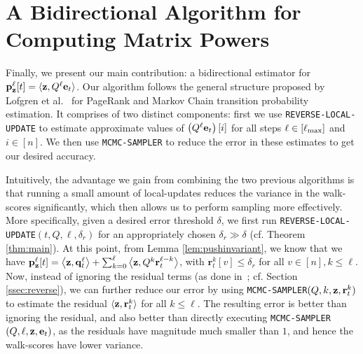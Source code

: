 
\section{A Bidirectional Algorithm for Computing Matrix Powers}
\label{ssec:bidiralgo}

Finally, we present our main contribution: a bidirectional estimator for ${\mathbf{p}}_\mathbf{z}^{\ell}[t] = \langle\mathbf{z},Q^{\ell}\mathbf{e}_t\rangle$. 
Our algorithm follows the general structure proposed by Lofgren et al.~\cite{Lofgren2014,banerjee2015fast} for PageRank and Markov Chain transition probability estimation.
It comprises of two distinct components: first we use  \texttt{REVERSE-LOCAL-UPDATE} to estimate approximate values of $\left(Q^{\ell}\mathbf{e}_t\right)[i]$ for all steps $\ell \in[\ell_{\max}]$ and $i\in[n]$. 
We then use \texttt{MCMC-SAMPLER} to reduce the error in these estimates to get our desired accuracy.


Intuitively, the advantage we gain from combining the two previous algorithms is that running a small amount of local-updates reduces the variance in the walk-scores significantly, which then allows us to perform sampling more effectively.
More specifically, given a desired error threshold $\delta$, we first run \texttt{REVERSE-LOCAL-UPDATE}$(t,Q,\ell,\delta_r)$ for an appropriately chosen $\delta_r\gg\delta$ (cf. Theorem \ref{thm:main}). 
At this point, from Lemma \ref{lem:pushinvariant}, we know that we have
${\mathbf{p}}_\mathbf{z}^{\ell}[t] = \left< \mathbf{z}, \mathbf{q}_t^{\ell} \right> + \sum_{k=0}^{\ell} \left< \mathbf{z}, Q^k\mathbf{r}_t^{\ell-k} \right>$, with $\mathbf{r}_t^{k}[v]\leq\delta_r$ for all $v\in[n],k\leq\ell$.
Now, instead of ignoring the residual terms (as done in~\cite{andersen2007local,lee2014asynchronous}; cf. Section \ref{ssec:reverse}), we can further reduce our error by using \texttt{MCMC-SAMPLER}$(Q,k,\mathbf{z},\mathbf{r}_t^k)$ to estimate the residual $\langle\mathbf{z},\mathbf{r}_t^k\rangle$ for all $k\leq\ell$.
The resulting error is better than ignoring the residual, and also better than directly executing \texttt{MCMC-SAMPLER}$(Q,\ell,\mathbf{z},\mathbf{e}_{t})$, as the residuals have magnitude much smaller than $1$, and hence the walk-scores have lower variance.

